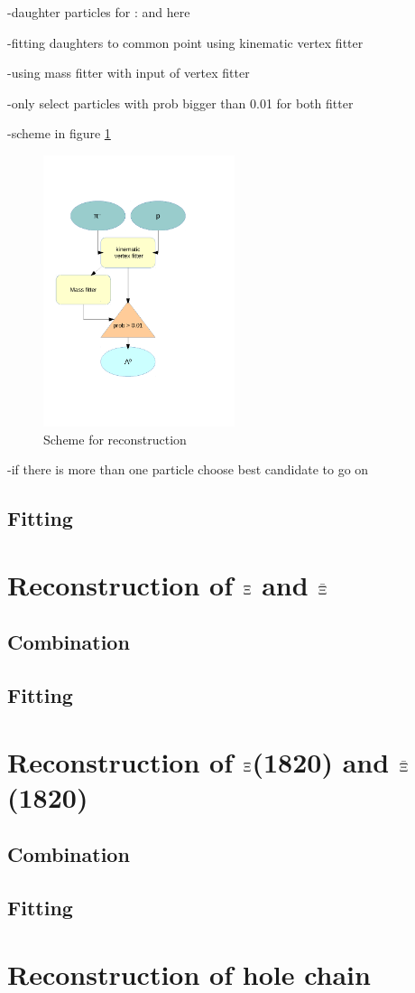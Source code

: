 		-daughter particles for \alam: \antiproton and \piplus here \piplus2 
		
		-fitting daughters to common point using kinematic vertex fitter
		
		-using mass fitter with input of vertex fitter 
		
		-only select particles with prob bigger than 0.01 for both fitter
		
		-scheme in figure \ref{fig:lambda_scheme}
		
		\begin{figure}
			\centering
				\includegraphics[width=0.50\textwidth]{./plots/combineLambda0.pdf}
			\caption{Scheme for \lam reconstruction}
			\label{fig:lambda_scheme}
		\end{figure}
		
		-if there is more than one particle choose best candidate to go on
		
	\subsection{Fitting}
	
\section{Reconstruction of $\boldmath{\Xi}$ and $\boldmath{\bar{\Xi}}$}
	\subsection{Combination}
	\subsection{Fitting}

\section{Reconstruction of $\boldmath{\Xi}$(1820) and $\boldmath{\bar{\Xi}}$(1820)}
	\subsection{Combination}
	\subsection{Fitting}
	
\section{Reconstruction of hole chain}